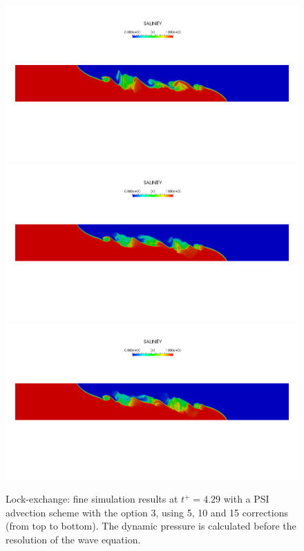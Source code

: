 \begin{figure}[ht]
  \begin{center}
    \includegraphics[scale=0.25, trim=35 300 0 300, clip]{./img/lock-exchange_0,025_80p_dpwaveq_PSI3_5corr.png}
    \includegraphics[scale=0.25, trim=35 300 0 300, clip]{./img/lock-exchange_0,025_80p_dpwaveq_PSI3_10corr.png}
    \includegraphics[scale=0.25, trim=35 300 0 300, clip]{./img/lock-exchange_0,025_80p_dpwaveq_PSI3_15corr.png}
    \caption{Lock-exchange: fine simulation results at $t^+=4.29$ with a PSI advection scheme
      with the option 3, using 5, 10 and 15 corrections (from top to bottom).
      The dynamic pressure is calculated before the resolution of the wave equation.}
    \label{fig:fine_sim_dpwaveq}
  \end{center}
\end{figure}

